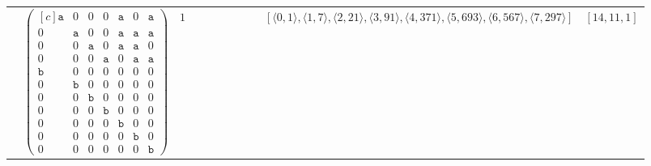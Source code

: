 \documentclass[12pt]{article}
\theoremstyle{definition}
\theoremstyle{plain}
\begin{document}
{\begin{longtable}{@{}cYcccccccZc@{}}
\cmidrule(lr){2-11}


& $\begin{pmatrix*}[c]
\mathtt{a}   &  0    &  0    &   0  &  \mathtt{a}  &  0  &  \mathtt{a}  \\
0   &  \mathtt{a}    &  0    &   0  &  \mathtt{a}  &  \mathtt{a}  &  \mathtt{a}  \\
0   &  0    &  \mathtt{a}    &   0  &  \mathtt{a}  &  \mathtt{a}  &  0  \\
0   &  0    &  0    &   \mathtt{a}  &  0  &  \mathtt{a}  &  \mathtt{a}  \\
\mathtt{b}   &  0    &  0    &   0  &  0  &  0  &  0  \\
0   &  \mathtt{b}    &  0    &   0  &  0  &  0  &  0  \\
0   &  0    &  \mathtt{b}    &   0  &  0  &  0  &  0  \\
0   &  0    &  0    &   \mathtt{b}  &  0  &  0  &  0  \\
0   &  0    &  0    &   0  &  \mathtt{b}  &  0  &  0  \\
0   &  0    &  0    &   0  &  0  &  \mathtt{b}  &  0  \\
0   &  0    &  0    &   0  &  0  &  0  &  \mathtt{b}
\end{pmatrix*}$
& $1$
&
&
&
&
&
&
& $[\langle0,1\rangle,\allowbreak\langle1,7\rangle,\allowbreak\langle2,21\rangle,\allowbreak\langle3,91\rangle,\allowbreak\langle4,371\rangle,\allowbreak\langle5,693\rangle,\allowbreak\langle6,567\rangle,\allowbreak\langle7,297\rangle]$
& $[14,11,1]$     \\



\end{longtable}}
\end{document}
